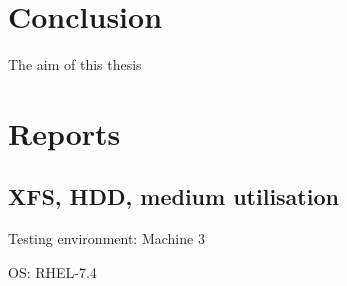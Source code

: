 \documentclass[
  color, %
  table, %
  lof,   %
  lot,   %
]{fithesis3}
\begin{document}











\chapter{Conclusion}
\label{conclusion}
The aim of this thesis














\printbibliography[heading=bibintoc]

\appendix %
\chapter{Reports}\label{reports}
\section{XFS, HDD, medium utilisation}

\begin{compactenum}
  \item Testing environment: Machine 3
  \item OS: RHEL-7.4 
  \end{compactenum}
\end{document}
